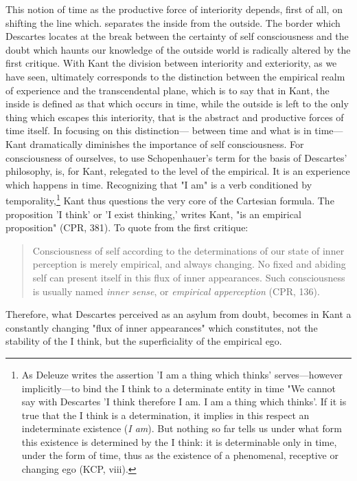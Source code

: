 This notion of time as the productive force of interiority depends, first of all, on shifting the line which. separates the inside from the outside. The border which Descartes locates at the break between the certainty of self consciousness and the doubt which haunts our knowledge of the outside world is radically altered by the first critique. With Kant the division between interiority and exteriority, as we have seen, ultimately corresponds to the distinction between the empirical realm of experience and the transcendental plane, which is to say that in Kant, the inside is defined as that which occurs in time, while the outside is left to the only thing which escapes this interiority, that is the abstract and productive forces of time itself. 
In focusing on this distinction---
between time and what is in time---Kant dramatically diminishes the importance of self consciousness. For consciousness of ourselves, to use Schopenhauer's term for the basis of Descartes' philosophy, is, for Kant, relegated to the level of the empirical. It is an experience which happens in time. Recognizing that "I am" is a verb conditioned by temporality,\footnote{As Deleuze writes the assertion 'I am a thing which thinks' serves---however implicitly---to bind the I think to a determinate entity in time "We cannot say with Descartes 'I think therefore I am. I am a thing which thinks'. If it is true that the I think is a determination, it implies in this respect an indeterminate existence (\textit{I am}). But nothing so far tells us under what form this existence is determined by the I think: it is determinable only in time, under the form of time, thus as the existence of a phenomenal, receptive or changing ego (KCP, viii).} Kant thus questions the very core of the Cartesian formula. The proposition 'I think' or 'I exist thinking,' writes Kant, "is an empirical proposition" (CPR, 381). To quote from the first critique: 

\begin{quote}
    Consciousness of self according to the determinations of our state of inner perception is merely empirical, and always changing. No fixed and abiding self can present itself in this flux of inner appearances. Such consciousness is usually named \textit{inner sense}, or \textit{empirical apperception} (CPR, 136).
\end{quote}

Therefore, what Descartes perceived as an asylum from doubt, becomes in Kant a constantly changing "flux of inner appearances" which constitutes, not the stability of the I think, but the superficiality of the empirical ego.

